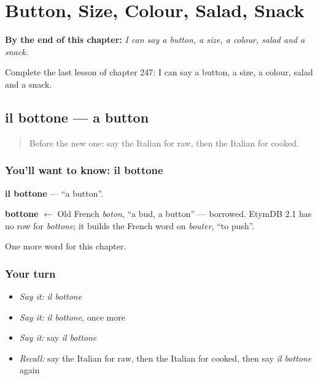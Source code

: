 
\chapter{Button, Size, Colour, Salad, Snack}
\label{ch:it-button-size-colour-salad-snack}

\begin{chapteropening}
\textbf{By the end of this chapter:} \emph{I can say a button, a size, a colour, salad and a snack.}

Complete the last lesson of chapter 247: I can say a button, a size, a colour, salad and a snack.
\end{chapteropening}

\section[il bottone]{il bottone — a button}

\label{lesson:IT-C247-bottone}



\begin{quote}
Before the new one: say the Italian for raw, then the Italian for cooked.
\end{quote}

\subsection*{You'll want to know: il bottone}
\textbf{il bottone} — \textquotedblleft{}a button\textquotedblright{}.

\begin{cousinweb}
\textbf{bottone} $\leftarrow$ Old French \emph{boton}, \textquotedblleft{}a bud, a button\textquotedblright{} — borrowed. EtymDB 2.1 has no row for \emph{bottone}; it builds the French word on \emph{bouter}, \textquotedblleft{}to push\textquotedblright{}.
\end{cousinweb}

\begin{grammarlens}[title={What you've built}]
One more word for this chapter.
\end{grammarlens}

\subsection*{Your turn}
\begin{itemize}
\raggedright
  \item \emph{Say it:} \emph{il bottone}
  \item \emph{Say it:} \emph{il bottone}, once more
  \item \emph{Say it:} say \emph{il bottone}
  \item \emph{Recall:} say the Italian for raw, then the Italian for cooked, then say \emph{il bottone} again
\end{itemize}

